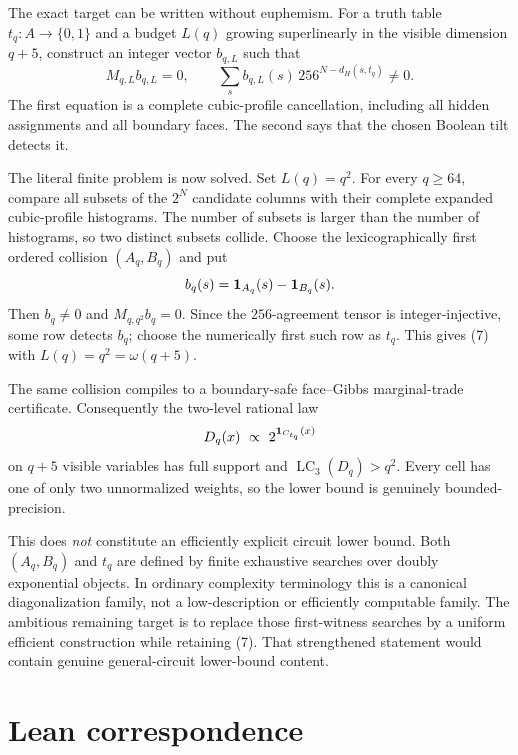 \documentclass[11pt]{article}
\newcommand{\bits}{\{0,1\}}
\newcommand{\LC}{\operatorname{LC}}
\begin{document}
The exact target can be written without euphemism.  For a truth table
$t_q:A\to\bits$ and a budget $L(q)$ growing superlinearly in the visible
dimension $q+5$, construct an integer vector $b_{q,L}$ such that
\[
  M_{q,L}b_{q,L}=0,
  \qquad
  \sum_s b_{q,L}(s)\,256^{N-d_H(s,t_q)}\ne0.    \tag{7}
\]
The first equation is a complete cubic-profile cancellation, including all
hidden assignments and all boundary faces.  The second says that the chosen
Boolean tilt detects it.

The literal finite problem is now solved.  Set $L(q)=q^2$.  For every
$q\ge64$, compare all subsets of the $2^N$ candidate columns with their
complete expanded cubic-profile histograms.  The number of subsets is larger
than the number of histograms, so two distinct subsets collide.  Choose the
lexicographically first ordered collision $(A_q,B_q)$ and put
\[
  b_q(s)={\bf1}_{A_q}(s)-{\bf1}_{B_q}(s).
\]
Then $b_q\ne0$ and $M_{q,q^2}b_q=0$.  Since the $256$-agreement tensor is
integer-injective, some row detects $b_q$; choose the numerically first such
row as $t_q$.  This gives (7) with $L(q)=q^2=\omega(q+5)$.

The same collision compiles to a boundary-safe face--Gibbs marginal-trade
certificate.  Consequently the two-level rational law
\[
  D_q(x)\ \propto\ 2^{{\bf1}_{C_{t_q}}(x)}
\]
on $q+5$ visible variables has full support and
$\LC_3(D_q)>q^2$.  Every cell has one of only two unnormalized weights, so
the lower bound is genuinely bounded-precision.

This does \emph{not} constitute an efficiently explicit circuit lower bound.
Both $(A_q,B_q)$ and $t_q$ are defined by finite exhaustive searches over
doubly exponential objects.  In ordinary complexity terminology this is a
canonical diagonalization family, not a low-description or efficiently
computable family.  The ambitious remaining target is to replace those
first-witness searches by a uniform efficient construction while retaining
(7).  That strengthened statement would contain genuine general-circuit
lower-bound content.

\section{Lean correspondence}
\end{document}
